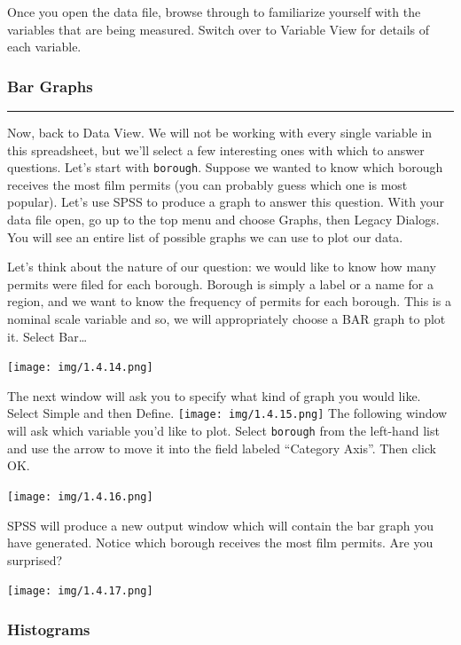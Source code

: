 \documentclass[]{book}
\begin{document}
Once you open the data file, browse through to familiarize yourself with
the variables that are being measured. Switch over to Variable View for
details of each variable.

\subsubsection{Bar Graphs}\label{bar-graphs}

\begin{center}\rule{0.5\linewidth}{0.5pt}\end{center}

Now, back to Data View. We will not be working with every single
variable in this spreadsheet, but we'll select a few interesting ones
with which to answer questions. Let's start with \texttt{borough}.
Suppose we wanted to know which borough receives the most film permits
(you can probably guess which one is most popular). Let's use SPSS to
produce a graph to answer this question. With your data file open, go up
to the top menu and choose {Graphs}, then {Legacy Dialogs}. You will see
an entire list of possible graphs we can use to plot our data.

Let's think about the nature of our question: we would like to know how
many permits were filed for each borough. Borough is simply a label or a
name for a region, and we want to know the frequency of permits for each
borough. This is a nominal scale variable and so, we will appropriately
choose a BAR graph to plot it. Select {Bar\ldots{}}

\texttt{[image: img/1.4.14.png]}

The next window will ask you to specify what kind of graph you would
like. Select {Simple} and then {Define}.
\texttt{[image: img/1.4.15.png]} The following window will ask which
variable you'd like to plot. Select \texttt{borough} from the left-hand
list and use the arrow to move it into the field labeled ``Category
Axis''. Then click {OK}.

\texttt{[image: img/1.4.16.png]}

SPSS will produce a new output window which will contain the bar graph
you have generated. Notice which borough receives the most film permits.
Are you surprised?

\texttt{[image: img/1.4.17.png]}

\subsubsection{Histograms}\label{histograms}
\end{document}
